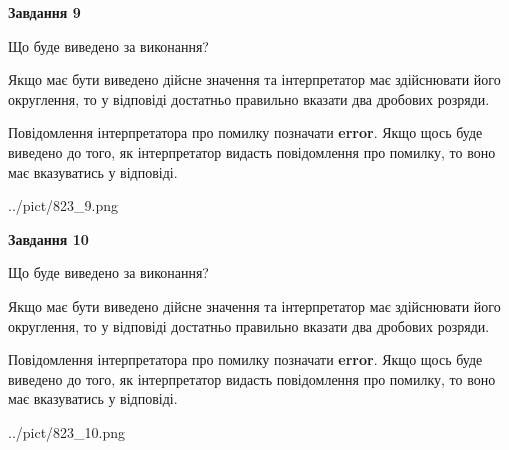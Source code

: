 \documentclass[12pt, ukrainian]{article}
\begin{document}
{\begin {Large}
{\begin {center}\textbf{Завдання 9}\end {center}}\par
Що буде виведено за виконання? \par

Якщо має бути виведено дійсне значення та інтерпретатор має здійснювати його округлення, 
то у відповіді достатньо правильно вказати два дробових розряди.

Повідомлення інтерпретатора про помилку позначати \textbf{error}.
Якщо щось буде виведено до того, як інтерпретатор видасть повідомлення про помилку, 
то воно має вказуватись у відповіді. \par

\begin{center}
	{../pict/823_9.png}
\end{center}
\newpage

{\begin {center}\textbf{Завдання 10}\end {center}}\par
Що буде виведено за виконання? \par

Якщо має бути виведено дійсне значення та інтерпретатор має здійснювати його округлення, 
то у відповіді достатньо правильно вказати два дробових розряди.

Повідомлення інтерпретатора про помилку позначати \textbf{error}.
Якщо щось буде виведено до того, як інтерпретатор видасть повідомлення про помилку, 
то воно має вказуватись у відповіді. \par

\begin{center}
	{../pict/823_10.png}
\end{center}
\newpage

\end {Large}}
\end{document}
